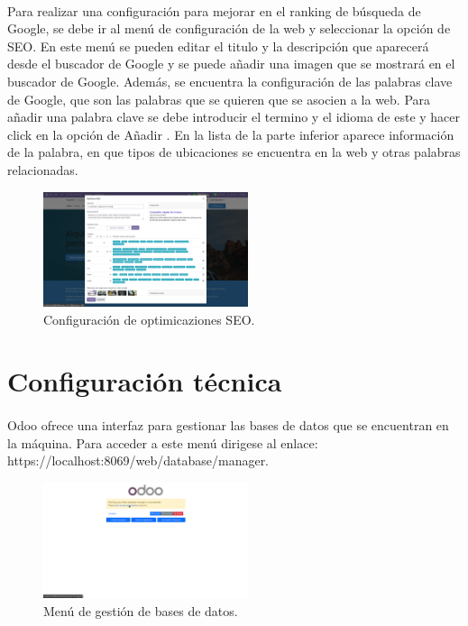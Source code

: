 \documentclass[paper=a4wide, fontsize=11pt]{report}	 %
\begin{document}
\paragraph{}
Para realizar una configuración para mejorar en el ranking de búsqueda de Google, se debe ir al menú de configuración de la web y seleccionar la opción de SEO.
En este menú se pueden editar el titulo y la descripción que aparecerá desde el buscador de Google y se puede añadir una imagen que se mostrará en el buscador de Google.
Además, se encuentra la configuración de las palabras clave de Google, que son las palabras que se quieren que se asocien a la web. Para añadir una palabra clave se debe introducir el termino y el idioma de este y hacer click en la opción de Añadir .
En la lista de la parte inferior aparece información de la palabra, en que tipos de ubicaciones se encuentra en la web y otras palabras relacionadas.
\begin{figure}[h]
    \centering
    \includegraphics[width=6cm]{rankingGoogle.png}
    \caption{Configuración de optimicaziones SEO.}
    \label{fig:faqs}
\end{figure}
\section{Configuración técnica}
\paragraph{}
Odoo ofrece una interfaz para gestionar las bases de datos que se encuentran en la máquina. Para acceder a este menú dirigese al enlace: https://localhost:8069/web/database/manager.
\begin{figure}[h]
    \centering
    \includegraphics[width=6cm]{manageDb.png}
    \caption{Menú de gestión de bases de datos.}
    \label{fig:faqs}
\end{figure}
\end{document}
